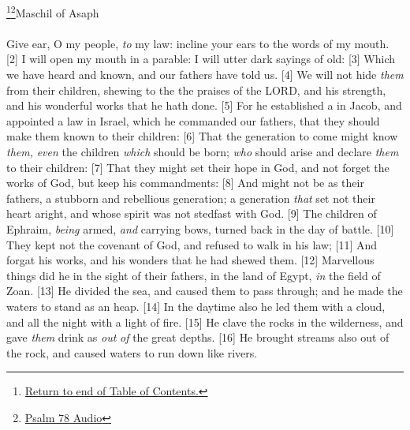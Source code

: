\footnote{\textcolor[rgb]{0.00,0.25,0.00}{\hyperlink{TOC}{Return to end of Table of Contents.}}}\footnote{\href{https://audiobible.com/bible/psalms_78.html}{\textcolor[cmyk]{0.99998,1,0,0}{Psalm 78 Audio}}}\textcolor[cmyk]{0.99998,1,0,0}{Maschil of Asaph}\\
\\
\textcolor[cmyk]{0.99998,1,0,0}{Give ear, O my people, \emph{to} my law: incline your ears to the words of my mouth.}
[2] \textcolor[cmyk]{0.99998,1,0,0}{I will open my mouth in a parable: I will utter dark sayings of old:}
[3] \textcolor[cmyk]{0.99998,1,0,0}{Which we have heard and known, and our fathers have told us.}
[4] \textcolor[cmyk]{0.99998,1,0,0}{We will not hide \emph{them} from their children, shewing to the  the praises of the LORD, and his strength, and his wonderful works that he hath done.}
[5] \textcolor[cmyk]{0.99998,1,0,0}{For he established a  in Jacob, and appointed a law in Israel, which he commanded our fathers, that they should make them known to their children:}
[6] \textcolor[cmyk]{0.99998,1,0,0}{That the generation to come might know \emph{them,} \emph{even} the children \emph{which} should be born; \emph{who} should arise and declare \emph{them} to their children:}
[7] \textcolor[cmyk]{0.99998,1,0,0}{That they might set their hope in God, and not forget the works of God, but keep his commandments:}
[8] \textcolor[cmyk]{0.99998,1,0,0}{And might not be as their fathers, a stubborn and rebellious generation; a generation \emph{that} set not their heart aright, and whose spirit was not stedfast with God.}
[9] \textcolor[cmyk]{0.99998,1,0,0}{The children of Ephraim, \emph{being} armed, \emph{and} carrying bows, turned back in the day of battle.}
[10] \textcolor[cmyk]{0.99998,1,0,0}{They kept not the covenant of God, and refused to walk in his law;}
[11] \textcolor[cmyk]{0.99998,1,0,0}{And forgat his works, and his wonders that he had shewed them.}
[12] \textcolor[cmyk]{0.99998,1,0,0}{Marvellous things did he in the sight of their fathers, in the land of Egypt, \emph{in} the field of Zoan.}
[13] \textcolor[cmyk]{0.99998,1,0,0}{He divided the sea, and caused them to pass through; and he made the waters to stand as an heap.}
[14] \textcolor[cmyk]{0.99998,1,0,0}{In the daytime also he led them with a cloud, and all the night with a light of fire.}
[15] \textcolor[cmyk]{0.99998,1,0,0}{He clave the rocks in the wilderness, and gave \emph{them} drink as \emph{out} \emph{of} the great depths.}
[16] \textcolor[cmyk]{0.99998,1,0,0}{He brought streams also out of the rock, and caused waters to run down like rivers.}

